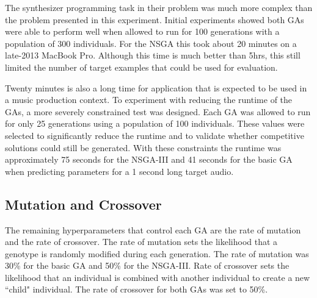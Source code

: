  The synthesizer programming task in their problem was much more complex than the problem presented in this experiment. Initial experiments showed both GAs were able to perform well when allowed to run for 100 generations with a population of 300 individuals. For the NSGA this took about 20 minutes on a late-2013 MacBook Pro. Although this time is much better than 5hrs, this still limited the number of target examples that could be used for evaluation. 
 
 Twenty minutes is also a long time for application that is expected to be used in a music production context. To experiment with reducing the runtime of the GAs, a more severely constrained test was designed. Each GA was allowed to run for only 25 generations using a population of 100 individuals. These values were selected to significantly reduce the runtime and to validate whether competitive solutions could still be generated. With these constraints the runtime was approximately 75 seconds for the NSGA-III and 41 seconds for the basic GA when predicting parameters for a 1 second long target audio.
 
 \subsection{Mutation and Crossover}
 The remaining hyperparameters that control each GA are the rate of mutation and the rate of crossover. The rate of mutation sets the likelihood that a genotype is randomly modified during each generation. The rate of mutation was 30\% for the basic GA and 50\% for the NSGA-III. Rate of crossover sets the likelihood that an individual is combined with another individual to create a new ``child" individual. The rate of crossover for both GAs was set to 50\%.





